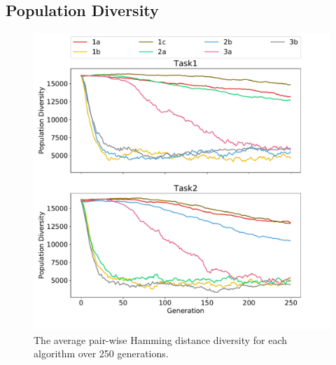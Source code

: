 \subsection{Population Diversity}
\begin{figure}[!ht]
    \includegraphics[width=\textwidth, center]{Chapters/4.Experiments/exp3/figures/diversity_hamming.pdf}
    \caption[Hamming diversity plot]{The average pair-wise Hamming distance diversity for each algorithm over 250 generations.}
    \label{fig:exp3.hamming}
\end{figure}
